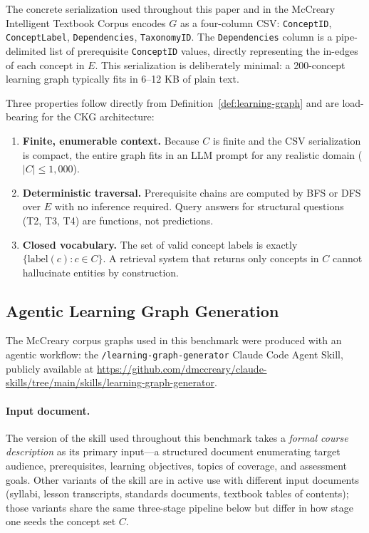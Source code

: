 The concrete serialization used throughout this paper and in the McCreary
Intelligent Textbook Corpus encodes $G$ as a four-column CSV:
\texttt{ConceptID}, \texttt{ConceptLabel}, \texttt{Dependencies},
\texttt{TaxonomyID}. The \texttt{Dependencies} column is a pipe-delimited
list of prerequisite \texttt{ConceptID} values, directly representing the
in-edges of each concept in $E$. This serialization is deliberately minimal:
a 200-concept learning graph typically fits in 6--12 KB of plain text.

Three properties follow directly from Definition~\ref{def:learning-graph}
and are load-bearing for the CKG architecture:
\begin{enumerate}
  \item \textbf{Finite, enumerable context.} Because $C$ is finite and the
    CSV serialization is compact, the entire graph fits in an LLM prompt
    for any realistic domain ($|C| \leq 1{,}000$).
  \item \textbf{Deterministic traversal.} Prerequisite chains are computed
    by BFS or DFS over $E$ with no inference required. Query answers for
    structural questions (T2, T3, T4) are functions, not predictions.
  \item \textbf{Closed vocabulary.} The set of valid concept labels is
    exactly $\{\mathrm{label}(c) : c \in C\}$. A retrieval system that
    returns only concepts in $C$ cannot hallucinate entities by construction.
\end{enumerate}

\subsection{Agentic Learning Graph Generation}\label{sec:lg-gen}

The McCreary corpus graphs used in this benchmark were produced with an
agentic workflow: the \texttt{/learning-graph-generator} Claude Code
Agent Skill, publicly available at
\url{https://github.com/dmccreary/claude-skills/tree/main/skills/learning-graph-generator}.

\paragraph{Input document.}
The version of the skill used throughout this benchmark takes a
\emph{formal course description} as its primary input---a structured
document enumerating target audience, prerequisites, learning
objectives, topics of coverage, and assessment goals. Other variants of
the skill are in active use with different input documents (syllabi,
lesson transcripts, standards documents, textbook tables of contents);
those variants share the same three-stage pipeline below but differ in
how stage one seeds the concept set $C$.

